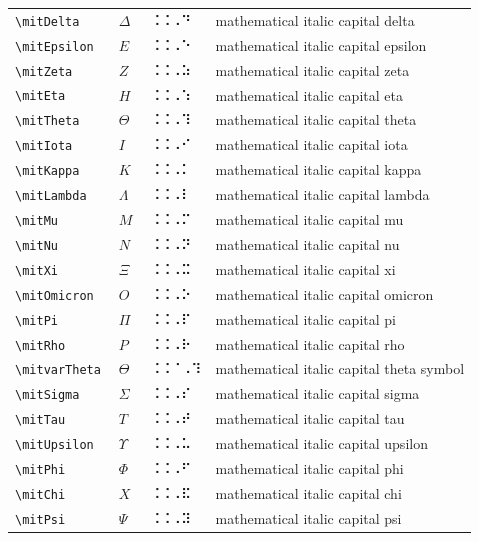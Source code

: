 \documentclass[oneside]{article}
\begin{document}
\begin{longtable}{llll}
\verb|\mitDelta| & $\mitDelta$ &  ⠨⠨⠠⠙  & {mathematical italic capital delta} \\[2ex]
\verb|\mitEpsilon| & $\mitEpsilon$ &  ⠨⠨⠠⠑  & {mathematical italic capital epsilon} \\[2ex]
\verb|\mitZeta| & $\mitZeta$ &  ⠨⠨⠠⠵  & {mathematical italic capital zeta} \\[2ex]
\verb|\mitEta| & $\mitEta$ &  ⠨⠨⠠⠱  & {mathematical italic capital eta} \\[2ex]
\verb|\mitTheta| & $\mitTheta$ &  ⠨⠨⠠⠹  & {mathematical italic capital theta} \\[2ex]
\verb|\mitIota| & $\mitIota$ &  ⠨⠨⠠⠊  & {mathematical italic capital iota} \\[2ex]
\verb|\mitKappa| & $\mitKappa$ &  ⠨⠨⠠⠅  & {mathematical italic capital kappa} \\[2ex]
\verb|\mitLambda| & $\mitLambda$ &  ⠨⠨⠠⠇  & {mathematical italic capital lambda} \\[2ex]
\verb|\mitMu| & $\mitMu$ &  ⠨⠨⠠⠍  & {mathematical italic capital mu} \\[2ex]
\verb|\mitNu| & $\mitNu$ &  ⠨⠨⠠⠝  & {mathematical italic capital nu} \\[2ex]
\verb|\mitXi| & $\mitXi$ &  ⠨⠨⠠⠭  & {mathematical italic capital xi} \\[2ex]
\verb|\mitOmicron| & $\mitOmicron$ &  ⠨⠨⠠⠕  & {mathematical italic capital omicron} \\[2ex]
\verb|\mitPi| & $\mitPi$ &  ⠨⠨⠠⠏  & {mathematical italic capital pi} \\[2ex]
\verb|\mitRho| & $\mitRho$ &  ⠨⠨⠠⠗  & {mathematical italic capital rho} \\[2ex]
\verb|\mitvarTheta| & $\mitvarTheta$ &  ⠨⠨⠈⠠⠹  & {mathematical italic capital theta symbol} \\[2ex]
\verb|\mitSigma| & $\mitSigma$ &  ⠨⠨⠠⠎  & {mathematical italic capital sigma} \\[2ex]
\verb|\mitTau| & $\mitTau$ &  ⠨⠨⠠⠞  & {mathematical italic capital tau} \\[2ex]
\verb|\mitUpsilon| & $\mitUpsilon$ &  ⠨⠨⠠⠥  & {mathematical italic capital upsilon} \\[2ex]
\verb|\mitPhi| & $\mitPhi$ &  ⠨⠨⠠⠋  & {mathematical italic capital phi} \\[2ex]
\verb|\mitChi| & $\mitChi$ &  ⠨⠨⠠⠯  & {mathematical italic capital chi} \\[2ex]
\verb|\mitPsi| & $\mitPsi$ &  ⠨⠨⠠⠽  & {mathematical italic capital psi} \\[2ex]

\end{longtable}
\end{document}
